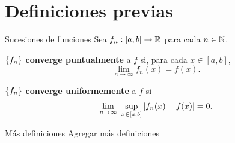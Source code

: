 \section{Definiciones previas}

\begin{frame}{Sucesiones de funciones}
    Sea $f_n:[a,b]\to\mathbb{R}$ para cada $n\in\mathbb{N}$.
    \begin{definicion}
        $\left\{ f_n \right\}$ \textbf{converge puntualmente} a $f$ si, para cada $x\in[a,b]$,
        \[
            \lim_{n\to\infty}f_n(x)=f(x).
        \]
    \end{definicion}
    \begin{definicion}
        $\left\{ f_n \right\}$ \textbf{converge uniformemente} a $f$ si
        \[
            \lim_{n\to\infty}\ \sup_{x\in[a,b]}\abs{f_n(x)-f(x)}=0.
        \]
    \end{definicion}
\end{frame}


\begin{frame}{Más definiciones}
    Agregar más definiciones
\end{frame}

